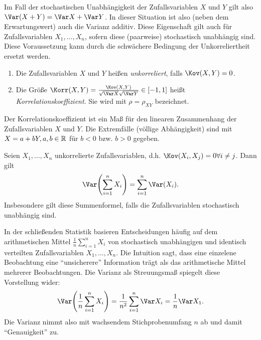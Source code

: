 \documentclass{lecture}
\begin{document}
    Im Fall der stochastischen Unabhängigkeit der Zufallsvariablen \(X\) und \(Y\) gilt also \(\Var\parentheses*{X + Y} = \Var X + \Var Y\).
    In dieser Situation ist also (neben dem Erwartungswert) auch die Varianz additiv.
    Diese Eigenschaft gilt auch für Zufallsvariablen \(X_1, \ldots, X_n\), sofern diese (paarweise) stochastisch unabhängig sind.
    Diese Voraussetzung kann durch die schwächere Bedingung der Unkorreliertheit ersetzt werden.

    \begin{definition}
        \begin{enumerate}
            \item Die Zufallsvariablen \(X\) und \(Y\) heißen \emph{unkorreliert}, falls \(\Kov\parentheses*{X, Y} = 0\).
            \item Die Größe \(\Korr\parentheses*{X, Y} = \frac{\Kov\parentheses*{X, Y}}{\sqrt{\Var X}\sqrt{\Var Y}} \in \brackets*{-1, 1}\) heißt \emph{Korrelationskoeffizient}.
            Sie wird mit \(\rho = \rho_{XY}\) bezeichnet.
        \end{enumerate}
    \end{definition}

    Der Korrelationskoeffizient ist ein Maß für den linearen Zusammenhang der Zufallsvariablen \(X\) und \(Y\).
    Die Extremfälle (völlige Abhängigkeit) sind mit \(X = a + bY, a, b \in \mathbb{R}\) für \(b < 0\) bzw. \(b > 0\) gegeben.

    \begin{theorem}
        Seien \(X_1, \ldots, X_n\) unkorrelierte Zufallsvariablen, d.h. \(\Kov\parentheses*{X_i, X_j} = 0 \forall i \ne j\).
        Dann gilt
        \[
            \Var\parentheses*{\sum_{i = 1}^n X_i} = \sum_{i = 1}^n \Var\parentheses*{X_i}.
        \]
        Insbesondere gilt diese Summenformel, falls die Zufallsvariablen stochastisch unabhängig sind.
    \end{theorem}

    \begin{remark}
        In der schließenden Statistik basieren Entscheidungen häufig auf dem arithmetischen Mittel \(\frac{1}{n}\sum_{i = 1}^n X_i\) von stochastisch unabhängigen und identisch verteilten Zufallsvariablen \(X_1, \ldots, X_n\).
        Die Intuition sagt, dass eine einzelene Beobachtung eine ``unsicherere'' Information trägt als das arithmetische Mittel mehrerer Beobachtungen.
        Die Varianz als Streuungsmaß spiegelt diese Vorstellung wider:
        \[
            \Var\parentheses*{\frac{1}{n}\sum_{i = 1}^n X_i} = \frac{1}{n^2}\sum_{i = 1}^n \Var X_i = \frac{1}{n}\Var X_1.
        \]
        Die Varianz nimmt also mit wachsendem Stichprobenumfang \(n\) ab und damit ``Genauigkeit'' zu.
    \end{remark}
\end{document}
